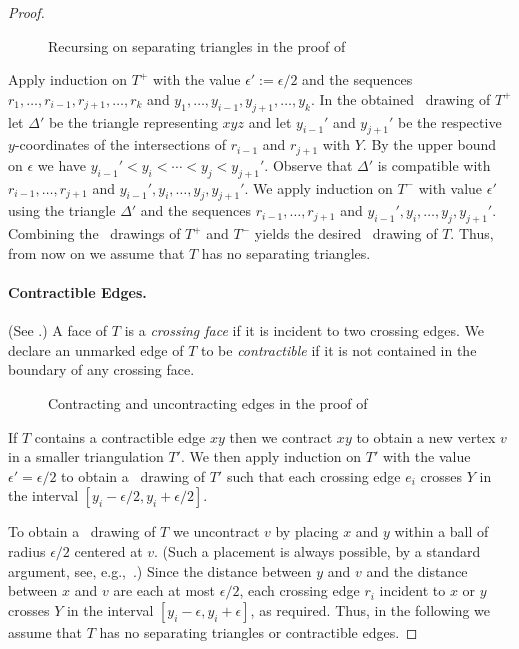 \begin{proof}
	\begin{figure}
		\caption{Recursing on separating triangles in the proof of
			}
\end{figure}
	
Apply induction on $T^+$ with the value $\epsilon':=\epsilon/2$ and the sequences $r_1,\ldots,r_{i-1},r_{j+1},\ldots,r_k$ and
	$y_1,\ldots,y_{i-1},y_{j+1},\ldots,y_k$. In the obtained \Fary\ drawing of $T^+$ let $\Delta'$ be the triangle representing  $xyz$ and let $y_{i-1}'$ and $y_{j+1}'$
	be the respective $y$-coordinates of the intersections of
	$r_{i-1}$ and $r_{j+1}$ with $Y$.  By the upper bound on
	$\epsilon$ we have $y_{i-1}'<y_i<\cdots<y_j<y_{j+1}'$.  Observe that
	$\Delta'$ is compatible with $r_{i-1},\ldots,r_{j+1}$ and
	$y_{i-1}',y_i,\ldots,y_j,y_{j+1}'$.
	We apply induction on $T^-$ with value $\epsilon'$ using the triangle $\Delta'$ and the sequences $r_{i-1},\ldots,r_{j+1}$ and
	$y_{i-1}',y_i,\ldots,y_{j},y_{j+1}'$.  Combining the \Fary\ drawings of $T^+$
	and $T^-$ yields the desired \Fary\ drawing of $T$.  Thus,
        from now on we assume that $T$ has no separating triangles.
	
	\paragraph{Contractible Edges.}
	(See .)
	A face of $T$ is a \emph{crossing
		face} if it is incident to two crossing edges. We declare an
	unmarked edge of $T$ to be \emph{contractible} if it is not contained
	in the boundary of any crossing face.  
	\begin{figure}
		\caption{Contracting and uncontracting edges in the proof of
			}
	\end{figure}
	
	If $T$ contains a contractible edge $xy$ then we contract $xy$ to
	obtain a new vertex $v$ in a smaller triangulation $T'$.   We then apply
	induction on $T'$ with the value $\epsilon'=\epsilon/2$ to obtain a \Fary\
	drawing of $T'$ such that each crossing edge $e_i$ crosses
	$Y$ in the interval $[y_i-\epsilon/2,y_i+\epsilon/2]$.
	
	To obtain a \Fary\ drawing of $T$ we uncontract $v$ by placing $x$ and $y$
	within a ball of radius $\epsilon/2$ centered at $v$. (Such
	a placement is always possible, by a standard argument, see, e.g.,~\cite{fary,w-sp-05}.)  Since the
	distance between $y$ and $v$ and the distance between $x$ and $v$ are each at most $\epsilon/2$,
	each crossing edge $r_i$ incident to $x$ or $y$ crosses $Y$ in the interval $[y_i-\epsilon,y_i+\epsilon]$, as required.
	Thus, in the following we assume that $T$ has no separating triangles or contractible
	edges.
	

\end{proof}
